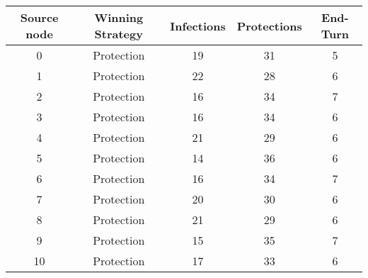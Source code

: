 \documentclass[results.tex]{subfiles}
\begin{document}
    \begin{center}
        \begin{tabular}{| c || c | c | c | c |}
            \hline
            {\bfseries Source node} & {\bfseries Winning Strategy} & {\bfseries Infections} & {\bfseries Protections}
            & {\bfseries End-Turn}
            \\  %
            \hline\hline
            0                       & Protection                   & 19                     & 31                      & 5                    \\
            \hline
            1                       & Protection                   & 22                     & 28                      & 6                    \\
            \hline
            2                       & Protection                   & 16                     & 34                      & 7                    \\
            \hline
            3                       & Protection                   & 16                     & 34                      & 6                    \\
            \hline
            4                       & Protection                   & 21                     & 29                      & 6                    \\
            \hline
            5                       & Protection                   & 14                     & 36                      & 6                    \\
            \hline
            6                       & Protection                   & 16                     & 34                      & 7                    \\
            \hline
            7                       & Protection                   & 20                     & 30                      & 6                    \\
            \hline
            8                       & Protection                   & 21                     & 29                      & 6                    \\
            \hline
            9                       & Protection                   & 15                     & 35                      & 7                    \\
            \hline
            10                      & Protection                   & 17                     & 33                      & 6                    \\

\end{tabular}
\end{center}
\end{document}
